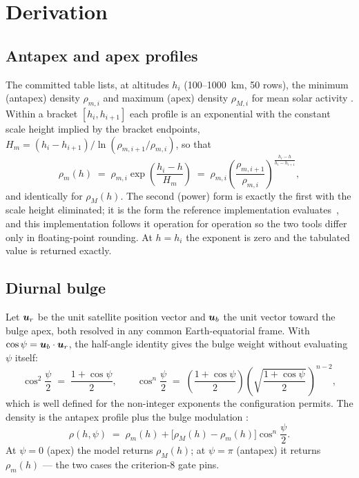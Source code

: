 \section{Derivation}
\label{sec:hp:derivation}

\subsection{Antapex and apex profiles}

The committed table lists, at altitudes $h_i$ (100--1000~km, 50 rows), the
minimum (antapex) density $\rho_{m,i}$ and maximum (apex) density
$\rho_{M,i}$ for mean solar activity
\cite[Sect.~3.5.2, pp.~89--91]{montenbruck2000}. Within a bracket
$[h_i, h_{i+1}]$ each profile is an exponential with the constant scale
height implied by the bracket endpoints,
$H_m = (h_i - h_{i+1}) / \ln(\rho_{m,i+1}/\rho_{m,i})$, so that
\begin{equation}
  \rho_m(h) \;=\; \rho_{m,i} \exp\!\left(\frac{h_i - h}{H_m}\right)
  \;=\; \rho_{m,i}
    \left(\frac{\rho_{m,i+1}}{\rho_{m,i}}\right)^{\textstyle
      \frac{h_i - h}{h_i - h_{i+1}}},
  \label{eq:hp:interp}
\end{equation}
and identically for $\rho_M(h)$. The second (power) form is exactly the
first with the scale height eliminated; it is the form the reference
implementation evaluates~\cite{orekithp}, and this implementation follows
it operation for operation so the two tools differ only in floating-point
rounding. At $h = h_i$ the exponent is zero and the tabulated value is
returned exactly.

\subsection{Diurnal bulge}

Let $\bm{u}_r$ be the unit satellite position vector and $\bm{u}_b$ the
unit vector toward the bulge apex, both resolved in any common
Earth-equatorial frame. With $\cos\psi = \bm{u}_b \cdot \bm{u}_r$, the
half-angle identity gives the bulge weight without evaluating $\psi$
itself:
\begin{equation}
  \cos^{2}\!\frac{\psi}{2} \;=\; \frac{1 + \cos\psi}{2},
  \qquad
  \cos^{n}\!\frac{\psi}{2}
    \;=\; \left(\frac{1 + \cos\psi}{2}\right)
          \left(\sqrt{\frac{1 + \cos\psi}{2}}\,\right)^{\!n-2},
  \label{eq:hp:cospow}
\end{equation}
which is well defined for the non-integer exponents the configuration
permits. The density is the antapex profile plus the bulge modulation
\cite[Sect.~3.5.2]{montenbruck2000}:
\begin{equation}
  \rho(h, \psi) \;=\; \rho_m(h)
    + \bigl[\rho_M(h) - \rho_m(h)\bigr]\cos^{n}\!\frac{\psi}{2}.
  \label{eq:hp:density}
\end{equation}
At $\psi = 0$ (apex) the model returns $\rho_M(h)$; at $\psi = \pi$
(antapex) it returns $\rho_m(h)$ --- the two cases the criterion-8 gate
pins.

